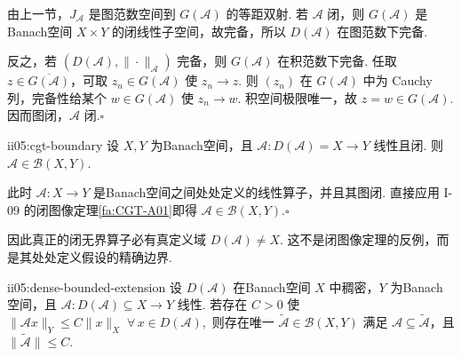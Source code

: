 \begin{FAProof}
由上一节，\(\displaystyle J_{\mathcal A}\) 是图范数空间到 \(\displaystyle G(\mathcal A)\) 的等距双射. 若 \(\displaystyle\mathcal A\) 闭，则 \(\displaystyle G(\mathcal A)\) 是Banach空间 \(\displaystyle X\times Y\) 的闭线性子空间，故完备，所以 \(\displaystyle D(\mathcal A)\) 在图范数下完备.

反之，若 \(\displaystyle(D(\mathcal A),\|\cdot\|_{\mathcal A})\) 完备，则 \(\displaystyle G(\mathcal A)\) 在积范数下完备. 任取 \(\displaystyle z\in\overline{G(\mathcal A)}\)，可取 \(\displaystyle z_n\in G(\mathcal A)\) 使 \(\displaystyle z_n\to z\). 则 \(\displaystyle(z_n)\) 在 \(\displaystyle G(\mathcal A)\) 中为 Cauchy 列，完备性给某个 \(\displaystyle w\in G(\mathcal A)\) 使 \(\displaystyle z_n\to w\). 积空间极限唯一，故 \(\displaystyle z=w\in G(\mathcal A)\). 因而图闭，\(\displaystyle\mathcal A\) 闭.\hfill\(\square\)
\end{FAProof}

\begin{FACorollary}[A][处处定义的闭算子必有界]{ii05:cgt-boundary}
设 \(\displaystyle X,Y\) 为Banach空间，且
\(\displaystyle \mathcal A:D(\mathcal A)=X\to Y\)
线性且闭. 则 \(\displaystyle\mathcal A\in\mathcal B(X,Y)\).
\end{FACorollary}

\begin{FAProof}
此时 \(\displaystyle\mathcal A:X\to Y\) 是Banach空间之间处处定义的线性算子，并且其图闭. 直接应用 I-09 的闭图像定理\autoref{fa:CGT-A01}即得 \(\displaystyle\mathcal A\in\mathcal B(X,Y)\).\hfill\(\square\)
\end{FAProof}

因此真正的闭无界算子必有真定义域 \(\displaystyle D(\mathcal A)\neq X\). 这不是闭图像定理的反例，而是其处处定义假设的精确边界.

\begin{FAProposition}[B][稠密定义上的一致有界估计给出唯一有界延拓]{ii05:dense-bounded-extension}
设 \(\displaystyle D(\mathcal A)\) 在Banach空间 \(\displaystyle X\) 中稠密，\(\displaystyle Y\) 为Banach空间，且
\(\displaystyle \mathcal A:D(\mathcal A)\subseteq X\to Y\)
线性. 若存在 \(\displaystyle C>0\) 使
\(\displaystyle \|\mathcal Ax\|_Y\leqslant C\|x\|_X \;\forall\,x\in D(\mathcal A),\)
则存在唯一 \(\displaystyle\widetilde{\mathcal A}\in\mathcal B(X,Y)\) 满足 \(\displaystyle\mathcal A\subseteq\widetilde{\mathcal A}\)，且 \(\displaystyle\|\widetilde{\mathcal A}\|\leqslant C\).
\end{FAProposition}

